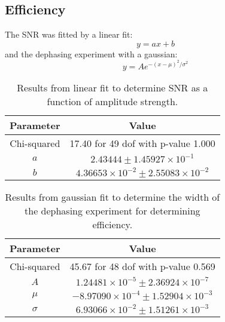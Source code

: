 \subsection{Efficiency}
The SNR was fitted by a linear fit:
\begin{equation}
    y = ax + b
\end{equation}
and the dephasing experiment with a gaussian:
\begin{equation}
    y = Ae^{-(x-\mu)^2 / \sigma^2}
\end{equation}
\begin{table}[h]
\centering
\begin{tabular}{|c|c|}
\hline
Parameter & Value \\
\hline
Chi-squared & 17.40 for 49 dof with p-value 1.000 \\
$a$ & $2.43444 \pm 1.45927 \times 10^{-1}$ \\
$b$ & $4.36653 \times 10^{-2} \pm 2.55083 \times 10^{-2}$ \\
\hline
\end{tabular}
\caption{Results from linear fit to determine SNR as a function of amplitude strength.}
\label{tab:fit_outcomes_ninth}
\end{table}

\begin{table}[h]
\centering
\begin{tabular}{|c|c|}
\hline
Parameter & Value \\
\hline
Chi-squared & 45.67 for 48 dof with p-value 0.569 \\
$A$ & $1.24481 \times 10^{-5} \pm 2.36924 \times 10^{-7}$ \\
$\mu$ & $-8.97090 \times 10^{-4} \pm 1.52904 \times 10^{-3}$ \\
$\sigma$ & $6.93066 \times 10^{-2} \pm 1.51261 \times 10^{-3}$ \\
\hline
\end{tabular}
\caption{Results from gaussian fit to determine the width of the dephasing experiment for determining efficiency.}
\label{tab:fit_outcomes_eighth}
\end{table}
